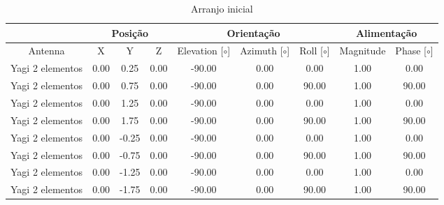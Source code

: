\begin{table}[H]
    \centering
    \tiny
    \begin{tabular}{c|c|c|c|c|c|c|c|c}
         & \multicolumn{3}{|c|}{Posição} & \multicolumn{3}{|c|}{Orientação} & \multicolumn{2}{|c}{Alimentação} \\
         \hline
        Antenna & X & Y & Z & Elevation [$\circ$] & Azimuth [$\circ$] & Roll [$\circ$] & Magnitude & Phase [$\circ$] \\
        \hline
        Yagi 2 elementos & 0.00 & 0.25 & 0.00 & -90.00 & 0.00 & 0.00 & 1.00 & 0.00 \\
        Yagi 2 elementos & 0.00 & 0.75 & 0.00 & -90.00 & 0.00 & 90.00 & 1.00 & 90.00 \\
        Yagi 2 elementos & 0.00 & 1.25 & 0.00 & -90.00 & 0.00 & 0.00 & 1.00 & 0.00 \\
        Yagi 2 elementos & 0.00 & 1.75 & 0.00 & -90.00 & 0.00 & 90.00 & 1.00 & 90.00 \\
        Yagi 2 elementos & 0.00 & -0.25 & 0.00 & -90.00 & 0.00 & 0.00 & 1.00 & 0.00 \\
        Yagi 2 elementos & 0.00 & -0.75 & 0.00 & -90.00 & 0.00 & 90.00 & 1.00 & 90.00 \\
        Yagi 2 elementos & 0.00 & -1.25 & 0.00 & -90.00 & 0.00 & 0.00 & 1.00 & 0.00 \\
        Yagi 2 elementos & 0.00 & -1.75 & 0.00 & -90.00 & 0.00 & 90.00 & 1.00 & 90.00 \\
    \end{tabular}
    \caption{Arranjo inicial}
    \label{tab:Arranjo Arranjo inicial}
\end{table}
